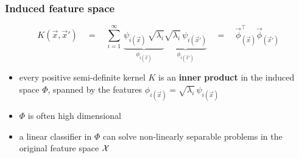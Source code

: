 \begin{frame}\frametitle{Induced feature space}
	$$
			K(\vec x, \vec x') 
			\quad=\quad 
			\sum_{i=1}^{\infty} \,
			\underbrace{\psi_{i(\vec x)} \, \sqrt{\lambda_i}}_{\phi_{i(\vec x)}}
			\underbrace{\sqrt{\lambda_i} \, \psi_{i(\vec x')} }_{\phi_{i(\vec x')}} 
			\quad=\quad \vec \phi_{(\vec x)}^\top \vec \phi_{(\vec x')}
	$$

	\begin{itemize}
		\item every positive semi-definite kernel $K$
			is an \textbf{inner product} in the induced space $\Phi$,
			spanned by the features
			$\phi_{i(\vec x)} = \sqrt{\lambda_i} \, \psi_{i(\vec x)}$
		\vspace{4mm}
		\item $\Phi$ is often high dimensional
		\vspace{4mm}
		\item a linear classifier in $\Phi$ can solve 
			non-linearly separable problems in the original feature space $\mathcal{X}$
	\end{itemize}
\end{frame}

